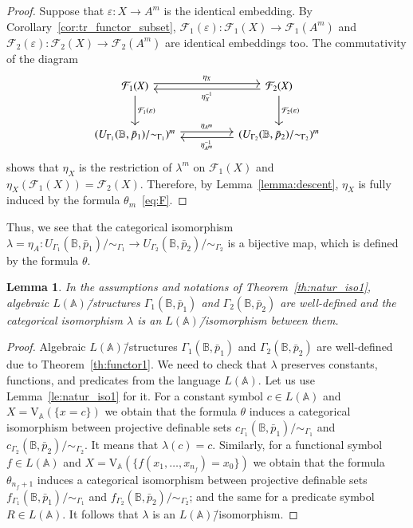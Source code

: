 \documentclass[12pt]{article}
\newtheorem{lemma}{Lemma}
\theoremstyle{definition}
\def\MA{{\mathbb{A}}}
\def\MB{{\mathbb{B}}}
\def\F{{\mathcal{F}}}
\def\V{{\mathrm{V}}}
\begin{document}
\begin{proof}
Suppose that $\varepsilon\colon X\to A^m$ is the identical embedding. By Corollary~\ref{cor:tr_functor_subset}, $\F_1(\varepsilon)\colon \F_1(X)\to \F_1(A^m)$ and $\F_2(\varepsilon)\colon \F_2(X)\to \F_2(A^m)$ are identical embeddings too. The commutativity of the diagram
\begin{equation*}
\begin{tikzcd}[column sep=huge, row sep=large]
\F_1(X) 
\arrow[r,leftarrow,shift right,"\eta_{X}^{-1}"']
\arrow[r,rightarrow,shift left,swap,"\eta_{X}"'] 
\arrow{d}{\F_1(\varepsilon)} 
& \F_2(X) 
\arrow{d}{\F_2(\varepsilon)}\\
(U_{\Gamma_1}(\MB,\bar p_1)/{\sim_{\Gamma_1}})^m 
\arrow[r,leftarrow,shift right,"\eta_{A^m}^{-1}"']
\arrow[r,rightarrow,shift left,swap,"\eta_{A^m}"']  
& (U_{\Gamma_2}(\MB,\bar p_2)/{\sim_{\Gamma_2}})^m
\end{tikzcd}    
\end{equation*}
shows that $\eta_X$ is
the restriction of $\lambda^m$ on $\F_1(X)$ and $\eta_X(\F_1(X))=\F_2(X)$. Therefore, by Lemma~\ref{lemma:descent}, $\eta_X$ is fully induced by the formula $\theta_m$~\eqref{eq:F}.  
\end{proof}

Thus, we see that the categorical isomorphism $\lambda=\eta_A\colon U_{\Gamma_1}(\MB,\bar p_1)/{\sim_{\Gamma_1}}\to U_{\Gamma_2}(\MB,\bar p_2)/{\sim_{\Gamma_2}}$ is a bijective map, which is defined by the formula $\theta$.

\begin{lemma}\label{le:natur_iso2}
    In the assumptions and notations of Theorem~\ref{th:natur_iso1}, algebraic $L(\MA)$\=/structures $\Gamma_1(\MB,\bar p_1)$ and $\Gamma_2(\MB,\bar p_2)$ are well-defined and the categorical isomorphism $\lambda$ is an $L(\MA)$\=/isomorphism between them.
\end{lemma}

\begin{proof}
Algebraic $L(\MA)$\=/structures $\Gamma_1(\MB,\bar p_1)$ and $\Gamma_2(\MB,\bar p_2)$ are well-defined due to Theorem~\ref{th:functor1}. 
We need to check that $\lambda$ preserves constants, functions, and predicates from the language $L(\MA)$. Let us use Lemma~\ref{le:natur_iso1} for it. 
For a constant symbol $c\in L(\MA)$ and $X=\V_\MA(\{x=c\})$ we obtain that the formula $\theta$ induces a categorical isomorphism  between projective definable sets $c_{\Gamma_1}(\MB,\bar p_1)/{\sim_{\Gamma_1}}$ and $c_{\Gamma_2}(\MB,\bar p_2)/{\sim_{\Gamma_2}}$. It means that $\lambda(c)=c$. Similarly, for a functional symbol $f\in L(\MA)$ and $X=\V_\MA(\{f(x_1,\ldots,x_{n_f})=x_0\})$ we obtain that the formula $\theta_{n_f+1}$ induces a categorical isomorphism  between projective definable sets $f_{\Gamma_1}(\MB,\bar p_1)/{\sim_{\Gamma_1}}$ and $f_{\Gamma_2}(\MB,\bar p_2)/{\sim_{\Gamma_2}}$; and the same for a predicate symbol $R\in L(\MA)$. It follows that $\lambda$ is an $L(\MA)$\=/isomorphism.
\end{proof}
\end{document}
